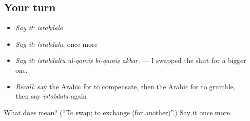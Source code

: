 \subsection*{Your turn}
\begin{itemize}
\raggedright
  \item \emph{Say it:} \emph{istabdala}
  \item \emph{Say it:} \emph{istabdala}, once more
  \item \emph{Say it:} \emph{istabdaltu al-qamīṣ bi-qamīṣ akbar.} — I swapped the shirt for a bigger one.
  \item \emph{Recall:} say the Arabic for to compensate, then the Arabic for to grumble, then say \emph{istabdala} again
\end{itemize}

\begin{tcolorbox}[breakable,colback=teal!4,colframe=teal!35!black,title={Before you move on}]
What does  mean? (\textquotedblleft{}To swap; to exchange (for another)\textquotedblright{}.) Say it once more.
\end{tcolorbox}
